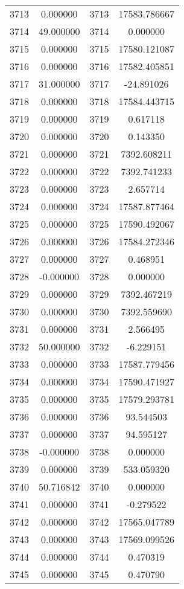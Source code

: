 \documentclass[12pt]{article}
\begin{document}
\begin{longtable}{@{}cccc@{}}
3713 & 0.000000 & 3713 & 17583.786667 \\
3714 & 49.000000 & 3714 & 0.000000 \\
3715 & 0.000000 & 3715 & 17580.121087 \\
3716 & 0.000000 & 3716 & 17582.405851 \\
3717 & 31.000000 & 3717 & -24.891026 \\
3718 & 0.000000 & 3718 & 17584.443715 \\
3719 & 0.000000 & 3719 & 0.617118 \\
3720 & 0.000000 & 3720 & 0.143350 \\
3721 & 0.000000 & 3721 & 7392.608211 \\
3722 & 0.000000 & 3722 & 7392.741233 \\
3723 & 0.000000 & 3723 & 2.657714 \\
3724 & 0.000000 & 3724 & 17587.877464 \\
3725 & 0.000000 & 3725 & 17590.492067 \\
3726 & 0.000000 & 3726 & 17584.272346 \\
3727 & 0.000000 & 3727 & 0.468951 \\
3728 & -0.000000 & 3728 & 0.000000 \\
3729 & 0.000000 & 3729 & 7392.467219 \\
3730 & 0.000000 & 3730 & 7392.559690 \\
3731 & 0.000000 & 3731 & 2.566495 \\
3732 & 50.000000 & 3732 & -6.229151 \\
3733 & 0.000000 & 3733 & 17587.779456 \\
3734 & 0.000000 & 3734 & 17590.471927 \\
3735 & 0.000000 & 3735 & 17579.293781 \\
3736 & 0.000000 & 3736 & 93.544503 \\
3737 & 0.000000 & 3737 & 94.595127 \\
3738 & -0.000000 & 3738 & 0.000000 \\
3739 & 0.000000 & 3739 & 533.059320 \\
3740 & 50.716842 & 3740 & 0.000000 \\
3741 & 0.000000 & 3741 & -0.279522 \\
3742 & 0.000000 & 3742 & 17565.047789 \\
3743 & 0.000000 & 3743 & 17569.099526 \\
3744 & 0.000000 & 3744 & 0.470319 \\
3745 & 0.000000 & 3745 & 0.470790 \\

\end{longtable}
\end{document}
